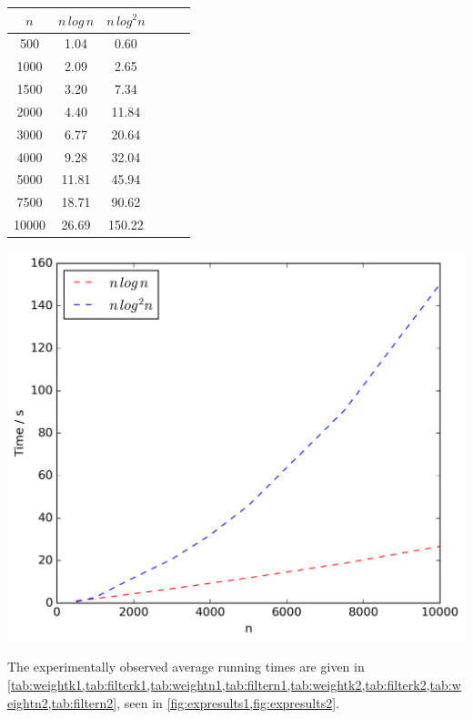 \documentclass[12pt,a4paper]{article}
\begin{document}
\begin{table}[!ht]
\begin{minipage}{0.49\textwidth}
\begin{tabular}{c||ccccc}
                $n$ & $n\,log\,n$ & $n\,log^2n$\\
                \hline\hline
                500 & 1.04 & 0.60\\
                1000 & 2.09 & 2.65\\
                1500 & 3.20 & 7.34\\
                2000 & 4.40 & 11.84\\
                3000 & 6.77 & 20.64\\
                4000 & 9.28 & 32.04\\
                5000 & 11.81 & 45.94\\
                7500 & 18.71 & 90.62\\
                10000 & 26.69 & 150.22\\
            \end{tabular}
            \includegraphics[scale=0.4]{varyingn2_filter}
        \end{minipage}
        \label{fig:expresults2}
    \end{table}

    The experimentally observed average running times are given in \cref{tab:weightk1,tab:filterk1,tab:weightn1,tab:filtern1,tab:weightk2,tab:filterk2,tab:weightn2,tab:filtern2}, seen in \cref{fig:expresults1,fig:expresults2}.
\end{document}

